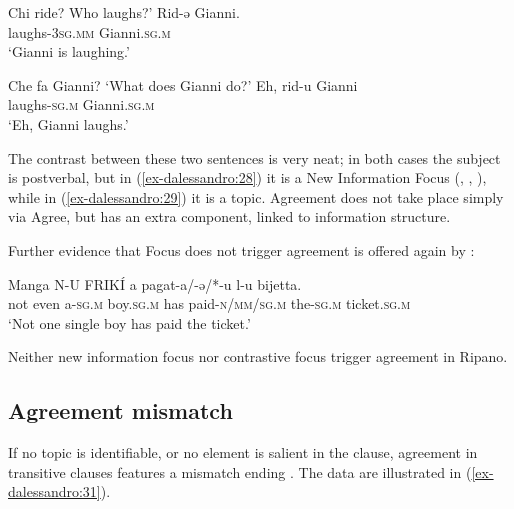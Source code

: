 \documentclass[output=paper
,modfonts
,nonflat]{langsci/langscibook}
\begin{document}
\begin{exe} \settowidth{}
	\ex \label{ex-dalessandro:28}\citet[9]{Paciaroni2017} \xlist
	\ex Chi ride?
	\glt Who laughs?'
	\ex
	\gll Rid-ə     Gianni. \\
	laughs-\textsc{3sg.mm} Gianni.\textsc{sg.m}\\ 
	\glt `Gianni is laughing.'
	\endxlist
\end{exe}
\begin{exe} \settowidth{}
	\ex \label{ex-dalessandro:29}\citet[9]{Paciaroni2017} \xlist
	\ex Che fa Gianni?
	\glt`What does Gianni do?'
	\ex
	\gll Eh,   rid-u     Gianni \\
	{} laughs-\textsc{sg.m} Gianni.\textsc{sg.m}\\ 
	\glt `Eh, Gianni laughs.'
	\endxlist
\end{exe}
The contrast between these two sentences is very neat; in both cases the subject is postverbal, but in (\ref{ex-dalessandro:28}) it is a New Information Focus (\citealt{Lambrecht1981}, \citealt{Cruschina2012}, \citealt{Frascarelli2007}), while in (\ref{ex-dalessandro:29}) it is a topic. Agreement does not take place simply via Agree, but has an extra component, linked to information structure.

Further evidence that Focus does not trigger agreement is offered again by \citet{Paciaroni2017}:

\begin{exe}
\ex
\gll Manga   N-U   FRIKÍ   a pagat-a/-ǝ/*-u  l-u    bijetta. \\
{not even}   a-\textsc{sg.m} boy.\textsc{sg.m} has paid-\textsc{n/mm/sg.m} the-\textsc{sg.m} ticket.\textsc{sg.m}\\
\glt `Not one single boy has paid the ticket.'
\end{exe}
Neither new information focus nor contrastive focus trigger agreement in Ripano.
\subsection{Agreement mismatch}\label{sec-dalessandro:4.4}
If no topic is identifiable, or no element is salient in the clause, agreement in transitive clauses features a mismatch ending \citep{D`Alessandro2017}. The data are illustrated in (\ref{ex-dalessandro:31}).
\end{document}

